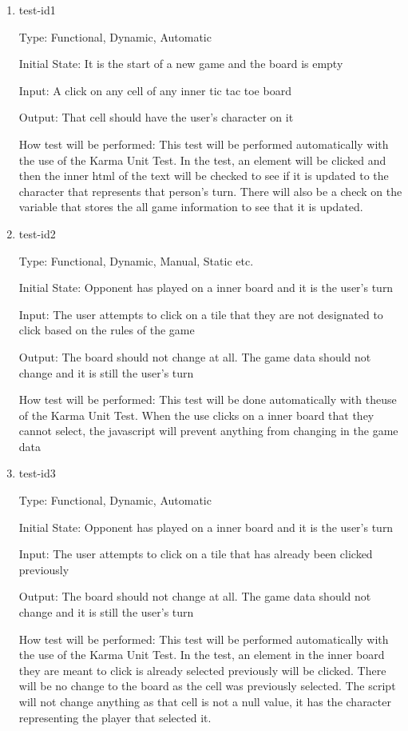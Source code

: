 \documentclass[12pt, titlepage]{article}
\begin{document}
\begin{enumerate}

\item{test-id1\\}

Type: Functional, Dynamic, Automatic
					
Initial State: It is the start of a new game and the board is empty
					
Input: A click on any cell of any inner tic tac toe board
					
Output: That cell should have the user's character on it
					
How test will be performed: This test will be performed automatically with the use of the Karma Unit Test. In the test, an element will be clicked and then the inner html of the text will be checked to see if it is updated to the character that represents that person's turn. There will also be a check on the variable that stores the all game information to see that it is updated.
					
\item{test-id2\\}

Type: Functional, Dynamic, Manual, Static etc.
					
Initial State: Opponent has played on a inner board and it is the user's turn
					
Input: The user attempts to click on a tile that they are not designated to click based on the rules of the game
					
Output: The board should not change at all. The game data should not change and it is still the user's turn
					
How test will be performed: This test will be done automatically with theuse of the Karma Unit Test. When the use clicks on a inner board that they cannot select, the javascript will prevent anything from changing in the game data

\item{test-id3\\}

Type: Functional, Dynamic, Automatic
					
Initial State: Opponent has played on a inner board and it is the user's turn
					
Input: The user attempts to click on a tile that has already been clicked previously
					
Output: The board should not change at all. The game data should not change and it is still the user's turn
					
How test will be performed: This test will be performed automatically with the use of the Karma Unit Test. In the test, an element in the inner board they are meant to click is already selected previously will be clicked. There will be no change to the board as the cell was previously selected. The script will not change anything as that cell is not a null value, it has the character representing the player that selected it.

\end{enumerate}
\end{document}
